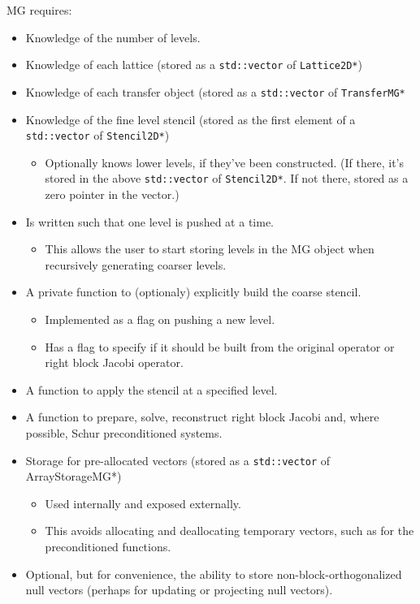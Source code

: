 \documentclass[pdftex,letterpaper,10pt]{article}
\begin{document}
MG requires:
\begin{itemize}
\item Knowledge of the number of levels.
\item Knowledge of each lattice (stored as a {\texttt{std::vector}} of \texttt{Lattice2D*})
\item Knowledge of each transfer object (stored as a {\texttt{std::vector}} of \texttt{TransferMG*}
\item Knowledge of the fine level stencil (stored as the first element of a {\texttt{std::vector}} of {\texttt{Stencil2D*}})
\begin{itemize}
\item Optionally knows lower levels, if they've been constructed. (If there, it's stored in the above {\texttt{std::vector}} of \texttt{Stencil2D*}. If not there, stored as a zero pointer in the vector.)
\end{itemize}
\item Is written such that one level is pushed at a time.
\begin{itemize}
\item This allows the user to start storing levels in the MG object when recursively generating coarser levels.
\end{itemize}
\item A private function to (optionaly) explicitly build the coarse stencil.
\begin{itemize}
\item Implemented as a flag on pushing a new level.
\item Has a flag to specify if it should be built from the original operator or right block Jacobi operator.
\end{itemize}
\item A function to apply the stencil at a specified level.
\item A function to prepare, solve, reconstruct right block Jacobi and, where possible, Schur preconditioned systems.
\item Storage for pre-allocated vectors (stored as a {\texttt{std::vector}} of ArrayStorageMG*)
\begin{itemize}
\item Used internally and exposed externally.
\item This avoids allocating and deallocating temporary vectors, such as for the preconditioned functions.
\end{itemize}
\item Optional, but for convenience, the ability to store non-block-orthogonalized null vectors (perhaps for updating or projecting null vectors).
\end{itemize}
\end{document}
